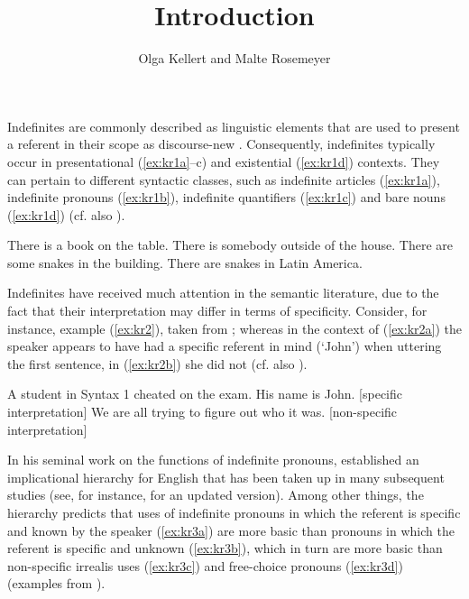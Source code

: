 \documentclass[output=paper,colorlinks,citecolor=brown]{langscibook}
\title{Introduction}
\author{Olga Kellert\orcid{}\affiliation{University of Göttingen} and Malte Rosemeyer\orcid{}\affiliation{Freie Universität Berlin}}
\begin{document}
\maketitle
\noindent \begin{sloppypar}
Indefinites are commonly described as linguistic elements that are used to present a referent in their scope as discourse-new \citep[1--15]{Lyons1999}. Consequently, indefinites typically occur in presentational (\ref{ex:kr1a}--c) and existential (\ref{ex:kr1d}) contexts. They can pertain to different syntactic classes, such as indefinite articles (\ref{ex:kr1a}), indefinite pronouns (\ref{ex:kr1b}), indefinite quantifiers (\ref{ex:kr1c}) and bare nouns (\ref{ex:kr1d}) (cf. also \citealt{Koch2012}).
\end{sloppypar}

\ea\label{ex:kr1}
    \ea\label{ex:kr1a} There is a book on the table.
    \ex\label{ex:kr1b} There is somebody outside of the house.
    \ex\label{ex:kr1c} There are some snakes in the building.
    \ex\label{ex:kr1d} There are snakes in Latin America.
    \z
\z

Indefinites have received much attention in the semantic literature, due to the fact that their interpretation may differ in terms of specificity. Consider, for instance, example (\ref{ex:kr2}), taken from \citet{FodorSag1982}; whereas in the context of (\ref{ex:kr2a}) the speaker appears to have had a specific referent in mind (`John') when uttering the first sentence, in (\ref{ex:kr2b}) she did not (cf. also \citealt{VonHeusinger2002}).

\ea\label{ex:kr2} A student in Syntax 1 cheated on the exam.
    \ea\label{ex:kr2a} His name is John.	[specific interpretation]
    \ex\label{ex:kr2b} We are all trying to figure out who it was. [non-specific interpretation]
    \z
\z

In his seminal work on the functions of indefinite pronouns, \citet[64]{Haspelmath1997} established an implicational hierarchy for English that has been taken up in many subsequent studies (see, for instance, \citealt{AloniPort2010} for an updated version). Among other things, the hierarchy predicts that uses of indefinite pronouns in which the referent is specific and known by the speaker (\ref{ex:kr3a}) are more basic than pronouns in which the referent is specific and unknown (\ref{ex:kr3b}), which in turn are more basic than non-specific irrealis uses (\ref{ex:kr3c}) and free-choice pronouns (\ref{ex:kr3d}) (examples from \citealt[3]{Haspelmath1997}).
\end{document}
